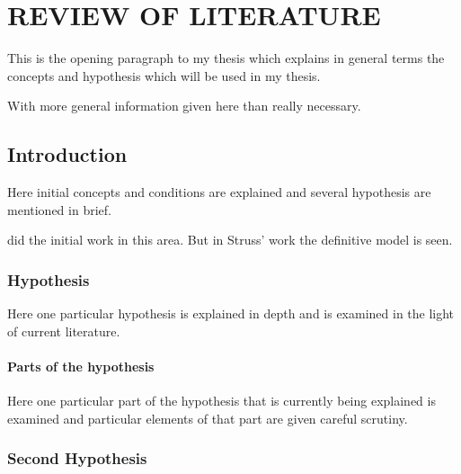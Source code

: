 \chapter{REVIEW OF LITERATURE}

This is the opening paragraph to my thesis which
explains in general terms the concepts and hypothesis
which will be used in my thesis.

With more general information given here than really
necessary.

\section{Introduction}

Here initial concepts and conditions are explained and
several hypothesis are mentioned in brief.

did the initial work in this area. But in Struss' work \autocite{buiEveryGeneratingPolytope2023}
the definitive model is seen.

\subsection{Hypothesis}

Here one particular hypothesis is explained in depth
and is examined in the light of current literature.

\subsubsection{Parts of the hypothesis}

Here one particular part of the hypothesis that is 
currently being explained is examined and particular
elements of that part are given careful scrutiny.


\subsection{Second Hypothesis}

